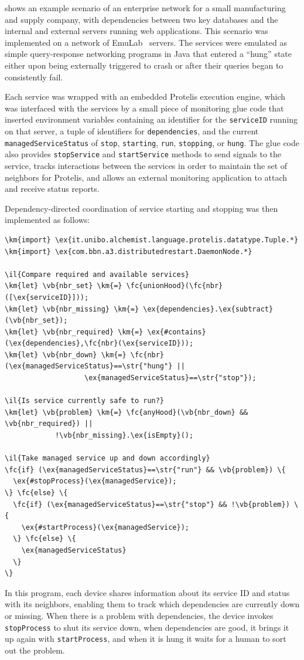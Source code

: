 \documentclass[12pt,a4paper,twoside,openright]{book}
\begin{document}
 shows an example scenario of an enterprise network for a small manufacturing and supply company, with dependencies between two key databases and the internal and external servers running web applications.
%
This scenario was implemented on a network of EmuLab~\cite{EmuLab} servers.
%
The services were emulated as simple query-response networking programs in Java that entered a ``hung'' state either upon being externally triggered to crash or after their queries began to consistently fail. 

Each service was wrapped with an embedded Protelis execution engine, which was interfaced with the services by a small piece of monitoring glue code that inserted environment variables containing an identifier for the {\tt serviceID} running on that server, a tuple of identifiers for {\tt dependencies}, and the current {\tt managedServiceStatus} of {\tt stop}, {\tt starting}, {\tt run}, {\tt stopping}, or {\tt hung}.
%
The glue code also provides {\tt stopService} and {\tt startService} methods to send signals to the service, tracks interactions between the services in order to maintain the set of neighbors for Protelis, and allows an external monitoring application to attach and receive status reports.

Dependency-directed coordination of service starting and stopping was then implemented as follows:
%
\begin{Verbatim}[samepage=true, frame=single, commandchars=\\\{\}]
\km{import} \ex{it.unibo.alchemist.language.protelis.datatype.Tuple.*}
\km{import} \ex{com.bbn.a3.distributedrestart.DaemonNode.*}

\il{Compare required and available services}
\km{let} \vb{nbr_set} \km{=} \fc{unionHood}(\fc{nbr}([\ex{serviceID}]));
\km{let} \vb{nbr_missing} \km{=} \ex{dependencies}.\ex{subtract}(\vb{nbr_set});
\km{let} \vb{nbr_required} \km{=} \ex{#contains}(\ex{dependencies},\fc{nbr}(\ex{serviceID})); 
\km{let} \vb{nbr_down} \km{=} \fc{nbr}(\ex{managedServiceStatus}==\str{"hung"} ||
                   \ex{managedServiceStatus}==\str{"stop"});

\il{Is service currently safe to run?}
\km{let} \vb{problem} \km{=} \fc{anyHood}(\vb{nbr_down} && \vb{nbr_required}) ||
            !\vb{nbr_missing}.\ex{isEmpty}();

\il{Take managed service up and down accordingly}
\fc{if} (\ex{managedServiceStatus}==\str{"run"} && \vb{problem}) \{
  \ex{#stopProcess}(\ex{managedService});
\} \fc{else} \{
  \fc{if} (\ex{managedServiceStatus}==\str{"stop"} && !\vb{problem}) \{
    \ex{#startProcess}(\ex{managedService});
  \} \fc{else} \{
    \ex{managedServiceStatus}
  \}
\}
\end{Verbatim}
In this program, each device shares information about its service ID and status with its neighbors, enabling them to track which dependencies are currently down or missing.
%
When there is a problem with dependencies, the device invokes {\tt stopProcess} to shut its service down, when dependencies are good, it brings it up again with {\tt startProcess}, and when it is hung it waits for a human to sort out the problem.
\end{document}
